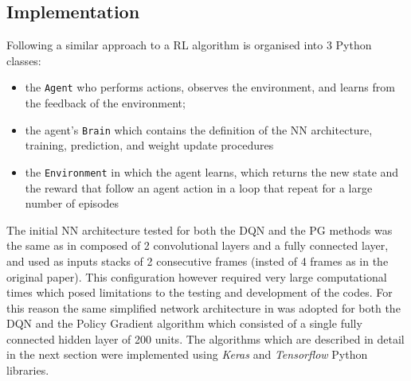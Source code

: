 \documentclass[a4paper, 11pt]{article}
\begin{document}
\subsection{Implementation}
Following a similar approach to \cite{Jaromiru} a RL algorithm is organised into 3 Python classes: 
\begin{itemize}
\item the \texttt{Agent} who performs actions, observes the environment, and learns from the feedback of the environment;
\item the agent's \texttt{Brain} which contains the definition of the NN architecture, training, prediction, and weight update procedures
\item the \texttt{Environment} in which the agent learns, which returns the new state and the reward that follow an agent action in a loop that repeat for a large number of episodes
\end{itemize}
The initial NN architecture tested for both the DQN and the PG methods was the same as in \cite{Mnih2013} composed of 2 convolutional layers and a fully connected layer, and used as inputs stacks of 2 consecutive frames (insted of 4 frames as in the original paper). This configuration however required very large computational times which posed limitations to the testing and development of the codes. For this reason the same simplified network architecture in \cite{Karpathy}  was adopted for both the DQN and the Policy Gradient algorithm which consisted of a single fully connected hidden layer of 200 units. The algorithms which are described in detail in the next section were  implemented using \emph{Keras} and \emph{Tensorflow} Python libraries. 
\end{document}
